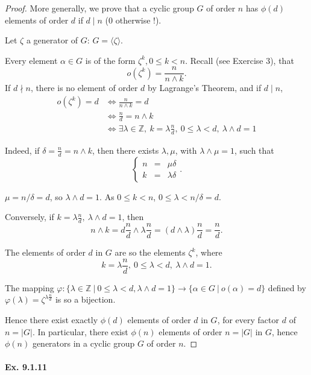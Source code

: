 \documentclass[11pt,a4paper]{article}
\newcommand{\Z}{\mathbb{Z}}
\begin{document}
\begin{proof}
More generally, we prove that a cyclic group $G$ of order $n$ has $\phi(d)$ elements of order $d$ if $d \mid n$ (0 otherwise !).

Let $\zeta$ a generator of $G$: $G = \langle \zeta \rangle$.

Every element $\alpha \in G$ is of the form $\zeta^k, 0 \leq k <n$. Recall (see Exercise 3), that 
$$o(\zeta^k) = \frac{n}{n\wedge k}.$$
If $d \nmid n$, there is no element of order $d$ by Lagrange's Theorem, and if $d \mid n$,
\begin{align*}
o(\zeta^k)  = d &\iff  \frac{n}{n\wedge k} = d\\
&\iff \frac{n}{d} = n \wedge k\\
&\iff\exists \lambda \in \Z,\  k = \lambda \frac{n}{d}, \ 0 \leq \lambda < d,\ \lambda \wedge d = 1
\end{align*}

Indeed, if $\delta = \frac{n}{d} = n \wedge k$, then there exists $\lambda, \mu$, with $\lambda \wedge \mu = 1$, such that
$$
\left\{
\begin{array}{ccc}
 n &  = & \mu \delta   \\
 k &   = & \lambda \delta     
\end{array}
\right.
.
$$

$\mu = n/\delta = d$, so $\lambda \wedge d = 1$. As $0\leq k < n$, $0 \leq \lambda < n/\delta = d$.

Conversely, if $ k = \lambda \frac{n}{d}, \ \lambda \wedge d = 1$, then $$n\wedge k = d\frac{n}{d} \wedge\lambda \frac{n}{d} =  (d \wedge \lambda) \frac{n}{d}=  \frac{n}{d}.$$

The elements of order $d$ in $G$ are so the elements $\zeta^k$, where $$k = \lambda \frac{n}{d}, \ 0 \leq \lambda < d,\ \lambda \wedge d = 1.$$

The mapping  $\varphi : \{\lambda \in \Z\ \vert \  0\leq \lambda <d, \lambda \wedge d = 1\} \to \{\alpha \in G \ \vert \ o(\alpha)= d\}$ 
defined by $\varphi(\lambda) = \zeta^{\lambda \frac{n}{d}}$ is so a bijection. 

Hence there exist exactly $\phi(d)$ elements of order $d$ in $G$, for every factor $d$ of $n = \vert G \vert$. In particular, there exist $\phi(n)$ elements of order $n = |G|$ in $G$, hence $\phi(n)$ generators in a cyclic group $G$ of order $n$.
\end{proof}

\paragraph{Ex. 9.1.11}
\end{document}
